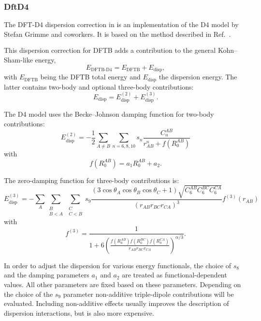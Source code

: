 \subsubsection{DftD4}
\label{sec:dftbp.DftD4}

The DFT-D4 dispersion correction in \dftbp{} is an implementation of the D4
model by Stefan Grimme and coworkers. It is based on the method described in
Ref.~\cite{caldeweyher-jcp-150-154122}.

This dispersion correction for DFTB adds a contribution to the general
Kohn--Sham-like energy,
\begin{equation*}
  E_{\text{DFTB-D4}} = E_{\text{DFTB}} + E_{\text{disp}},
\end{equation*}
with $E_{\text{DFTB}}$ being the DFTB total energy and $E_{\text{disp}}$ the
dispersion energy. The latter contains two-body and optional three-body
contributions:
\begin{equation*}
  E_{\text{disp}} = E_{\text{disp}}^{(2)} + E_{\text{disp}}^{(3)}.
\end{equation*}

The D4 model uses the Becke--Johnson damping function for two-body contributions:
\begin{equation*}
   E_{\text{disp}}^{(2)} = -\frac{1}{2} \sum_{A\neq B} \sum_{n=6,8,10} s_n
   \frac{C_n^{AB}}{r_{AB}^n + f(R_0^{AB})}
\end{equation*}
with
\begin{equation*}
   f(R_0^{AB}) = a_1 R_0^{AB} + a_2.
\end{equation*}

The zero-damping function for three-body contributions is:
\begin{equation*}
   E_{\text{disp}}^{(3)} = -\sum_{A}\sum_{\substack{B \\B < A}}\sum_{\substack{C\\ C < B}} s_9
   \frac{  \left(3\cos\theta_A\cos\theta_B\cos\theta_C+1\right)\sqrt{C_6^{AB}C_6^{BC}C_6^{CA}}}{(r_{AB}r_{BC}r_{CA})^3} f^{(3)}(r_{AB})
\end{equation*}
with
\begin{equation*}
   f^{(3)} = \frac{1}{1 + 6\left(\frac{f(R_0^{AB})f(R_0^{BC})f(R_0^{CA})}{r_{AB}r_{BC}r_{CA}}\right)^{\alpha/3}}.
\end{equation*}

In order to adjust the dispersion for various energy functionals, the choice of
$s_8$ and the damping parameters $a_1$ and $a_2$ are
treated as functional-dependent values. All other parameters are fixed based on
these parameters.
Depending on the choice of the $s_9$ parameter non-additive triple-dipole
contributions will be evaluated. Including non-additive effects usually improves
the description of dispersion interactions, but is also more expensive.

